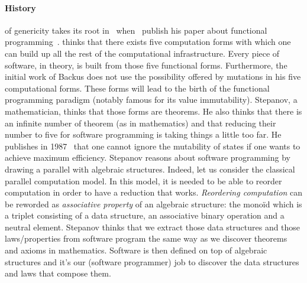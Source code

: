 \paragraph{History} of genericity takes its root in~
when~\citeauthor{backus.1978.functional} publish his paper about functional
programming~\parencite{backus.1978.functional}. \citeauthor{backus.1978.functional} thinks that there exists five
computation forms with which one can build up all the rest of the computational infrastructure. Every piece of software,
in theory, is built from those five functional forms. Furthermore, the initial work of Backus does not use the
possibility offered by mutations in his five computational forms. These forms will lead to the birth of the functional
programming paradigm (notably famous for its value immutability). Stepanov, a mathematician, thinks that those forms are
theorems. He also thinks that there is an infinite number of theorem (as in mathematics) and that reducing their number
to five for software programming is taking things a little too far.  He publishes in
1987~\parencite{stepanov.1987.higher} that one cannot ignore the mutability of states if one wants to achieve maximum
efficiency. Stepanov reasons about software programming by drawing a parallel with algebraic structures. Indeed, let us
consider the classical parallel computation model. In this model, it is needed to be able to reorder computation in
order to have a reduction that works. \emph{Reordering computation} can be reworded as \emph{associative property} of an
algebraic structure: the monoïd which is a triplet consisting of a data structure, an associative binary operation and a
neutral element. Stepanov thinks that we extract those data structures and those laws/properties from software program
the same way as we discover theorems and axioms in mathematics. Software is then defined on top of algebraic structures
and it's our (software programmer) job to discover the data structures and laws that compose them.


